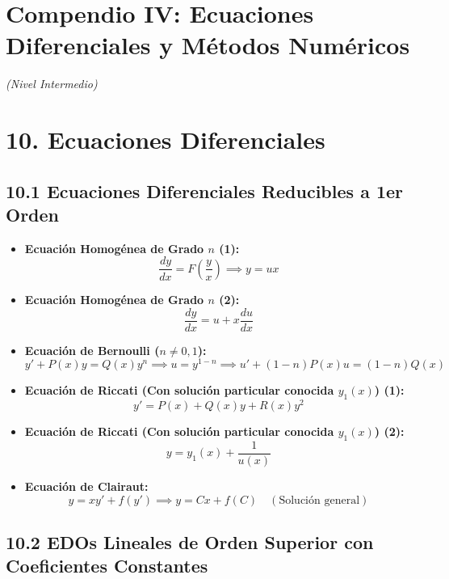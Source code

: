 \documentclass[11pt,a4paper]{article}
\begin{document}
\section*{Compendio IV: Ecuaciones Diferenciales y Métodos Numéricos}

\textit{(Nivel Intermedio)}

\section*{10. Ecuaciones Diferenciales}

\subsection*{10.1 Ecuaciones Diferenciales Reducibles a 1er Orden}

\begin{itemize}
  \item \textbf{Ecuación Homogénea de Grado $n$ (1):}
  \[
    \frac{dy}{dx} = F\left(\frac{y}{x}\right) \implies y = ux
  \]
  \item \textbf{Ecuación Homogénea de Grado $n$ (2):}
  \[
    \frac{dy}{dx} = u + x\frac{du}{dx}
  \]
  \item \textbf{Ecuación de Bernoulli ($n \ne 0, 1$):}
  \[
    y' + P(x)y = Q(x)y^n \implies u = y^{1 - n} \implies u' + (1 - n)P(x)u = (1 - n)Q(x)
  \]
  \item \textbf{Ecuación de Riccati (Con solución particular conocida $y_1(x)$) (1):}
  \[
    y' = P(x) + Q(x)y + R(x)y^2
  \]
  \item \textbf{Ecuación de Riccati (Con solución particular conocida $y_1(x)$) (2):}
  \[
    y = y_1(x) + \frac{1}{u(x)}
  \]
  \item \textbf{Ecuación de Clairaut:}
  \[
    y = x y' + f(y') \implies y = Cx + f(C) \quad (\text{Solución general})
  \]
\end{itemize}

\subsection*{10.2 EDOs Lineales de Orden Superior con Coeficientes Constantes}
\end{document}
